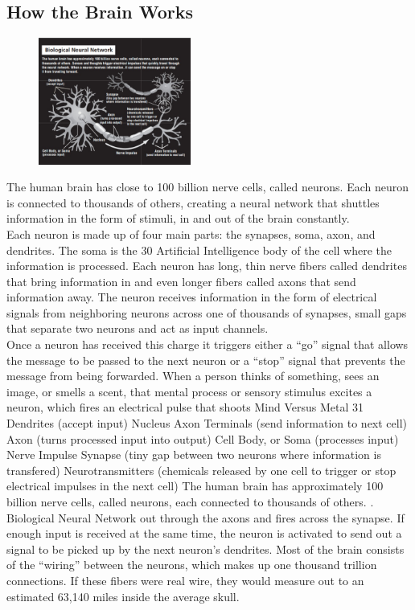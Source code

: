 \documentclass[12pt]{article}
\begin{document}
\subsection{\textbf{ How the Brain Works}}
\large
 \begin{figure}[h]
\center
  \includegraphics[width=5cm]{Image/IMG_20200125_233520.jpg}
  \caption{}
 \end{figure}
 \large
 The human brain has close to 100 billion nerve cells, called neurons. Each neuron is connected to thousands of others, creating a neural network that shuttles information in the form of stimuli, in and out of the brain constantly.\\
 Each neuron is made up of four main parts: the synapses, soma, axon, and dendrites. The soma is the
30 Artificial Intelligence
body of the cell where the information is processed. Each neuron has long, thin nerve fibers called dendrites that bring information in and even longer fibers called axons that send information away. The neuron receives information in the form of electrical signals from neighboring neurons across one of thousands of synapses, small gaps that separate two neurons and act as input channels.\\
Once a neuron has received this charge it triggers either a “go” signal that allows the message to be passed to the next neuron or a “stop” signal that prevents the message from being forwarded. When a person thinks of something, sees an image, or smells a scent, that mental process or sensory stimulus excites a neuron, which fires an electrical pulse that shoots
Mind Versus Metal 31
Dendrites (accept input)
Nucleus
Axon Terminals (send information to next cell) 
Axon (turns processed input into output) 
Cell Body, or Soma (processes input) Nerve Impulse
Synapse (tiny gap between two neurons where information is transfered)
Neurotransmitters (chemicals released by one cell to trigger or stop electrical impulses in the next cell)
The human brain has approximately 100 billion nerve cells, called neurons, each connected to
 thousands of others. . Biological Neural Network
out through the axons and fires across the synapse. If enough input is received at the same time, the neuron is activated to send out a signal to be picked up by the next neuron’s dendrites. Most of the brain consists of the “wiring” between the neurons, which makes up one thousand trillion connections. If these fibers were real wire, they would measure out to an estimated 63,140 miles inside the average skull. \\
\end{document}
